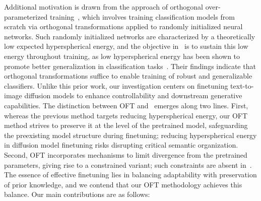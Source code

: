 Additional motivation is drawn from the approach of orthogonal over-parameterized training~\cite{liu2021orthogonal}, which involves training classification models from scratch via orthogonal transformations applied to randomly initialized neural networks. Such randomly initialized networks are characterized by a theoretically low expected hyperspherical energy, and the objective in~\cite{liu2021orthogonal} is to sustain this low energy throughout training, as low hyperspherical energy has been shown to promote better generalization in classification tasks~\cite{liu2018learning,lin2020regularizing}. Their findings indicate that orthogonal transformations suffice to enable training of robust and generalizable classifiers. Unlike this prior work, our investigation centers on finetuning text-to-image diffusion models to enhance controllability and downstream generative capabilities. The distinction between OFT and~\cite{liu2021orthogonal} emerges along two lines. First, whereas the previous method targets reducing hyperspherical energy, our OFT method strives to preserve it at the level of the pretrained model, safeguarding the preexisting model structure during finetuning; reducing hyperspherical energy in diffusion model finetuning risks disrupting critical semantic organization. Second, OFT incorporates mechanisms to limit divergence from the pretrained parameters, giving rise to a constrained variant; such constraints are absent in~\cite{liu2021orthogonal}. The essence of effective finetuning lies in balancing adaptability with preservation of prior knowledge, and we contend that our OFT methodology achieves this balance. Our main contributions are as follows:

